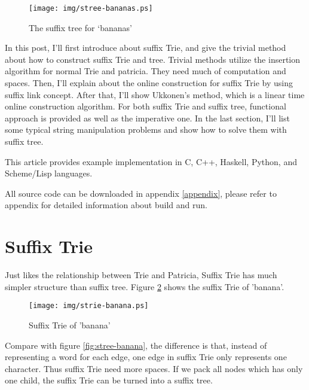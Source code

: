 \documentclass{article}
\begin{document}
\begin{figure}[htbp]
       \begin{center}
	\texttt{[image: img/stree-bananas.ps]}
        \caption{The suffix tree for `bananas'} \label{fig:stree-bananas}
       \end{center}
\end{figure}

In this post, I'll first introduce about suffix Trie, and give the trivial method
about how to construct suffix Trie and tree. Trivial methods utilize the insertion
algorithm for normal Trie and patricia. They need much of computation and spaces.
Then, I'll explain about the online construction for suffix Trie by using suffix link
concept. After that, I'll show Ukkonen's method, which is a linear time online 
construction algorithm. For both suffix Trie and suffix tree, functional approach
is provided as well as the imperative one. In the last section, I'll list some
typical string manipulation problems and show how to solve them with suffix tree.

This article provides example implementation in C, C++, Haskell, Python, and 
Scheme/Lisp languages. 

All source code can be downloaded in appendix \ref{appendix}, please 
refer to appendix for detailed information about build and run.

\section{Suffix Trie}
\label{suffix-trie}

Just likes the relationship between Trie and Patricia, Suffix Trie has much simpler
structure than suffix tree. Figure \ref{fig:strie-banana} shows the suffix Trie of
'banana'.

\begin{figure}[htbp]
       \begin{center}
	\texttt{[image: img/strie-banana.ps]}
        \caption{Suffix Trie of 'banana'} \label{fig:strie-banana}
       \end{center}
\end{figure}

Compare with figure \ref{fig:stree-banana}, the difference is that, instead of representing
a word for each edge, one edge in suffix Trie only represents one character. Thus
suffix Trie need more spaces. If we pack all nodes which has only one child, the suffix
Trie can be turned into a suffix tree.
\end{document}
